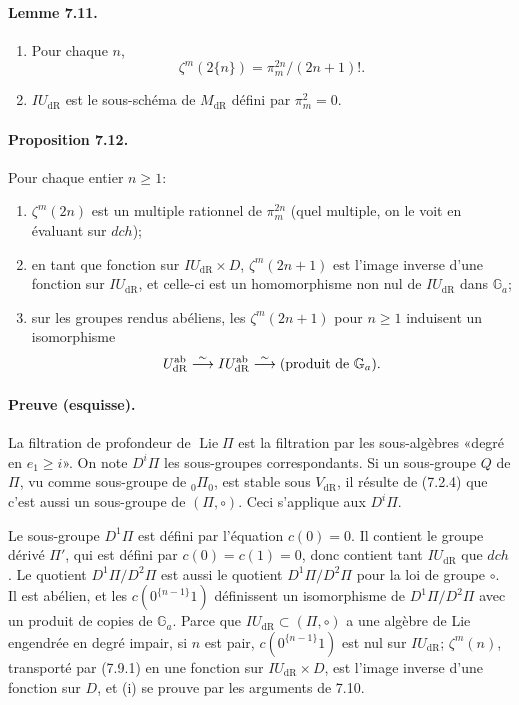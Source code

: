 \documentclass[10pt]{article}
\newcommand{\Ga}{\mathbb G_a}
\newcommand{\Lie}{\operatorname{Lie}}
\newcommand{\dR}{\mathrm{dR}}
\begin{document}
\paragraph{Lemme 7.11.}
\begin{enumerate}[label=(\roman*)]
\item Pour chaque $n$,
\[
\zeta^m(2\{n\})=\pi_m^{2n}/(2n+1)!.
\]
\item $IU_{\dR}$ est le sous-schéma de $M_{\dR}$ défini par $\pi_m^2=0$.
\end{enumerate}

\paragraph{Proposition 7.12.}
Pour chaque entier $n\geq1$:
\begin{enumerate}[label=(\roman*)]
\item $\zeta^m(2n)$ est un multiple rationnel de $\pi_m^{2n}$ (quel multiple, on le voit en évaluant sur $dch$);
\item en tant que fonction sur $IU_{\dR}\times D$, $\zeta^m(2n+1)$ est l'image inverse d'une fonction sur $IU_{\dR}$, et celle-ci est un homomorphisme non nul de $IU_{\dR}$ dans $\Ga$;
\item sur les groupes rendus abéliens, les $\zeta^m(2n+1)$ pour $n\geq1$ induisent un isomorphisme
\[
U_{\dR}^{\mathrm{ab}}\overset{\sim}{\longrightarrow}IU_{\dR}^{\mathrm{ab}}\overset{\sim}{\longrightarrow}\hbox{(produit de }\Ga\hbox{)}.
\]
\end{enumerate}

\paragraph{Preuve (esquisse).}
La filtration de profondeur de $\Lie\Pi$ est la filtration par les sous-algèbres «degré en $e_1\geq i$». On note $D^i\Pi$ les sous-groupes correspondants. Si un sous-groupe $Q$ de $\Pi$, vu comme sous-groupe de ${}_0\Pi_0$, est stable sous $V_{\dR}$, il résulte de (7.2.4) que c'est aussi un sous-groupe de $(\Pi,\circ)$. Ceci s'applique aux $D^i\Pi$.

Le sous-groupe $D^1\Pi$ est défini par l'équation $c(0)=0$. Il contient le groupe dérivé $\Pi'$, qui est défini par $c(0)=c(1)=0$, donc contient tant $IU_{\dR}$ que $dch$. Le quotient $D^1\Pi/D^2\Pi$ est aussi le quotient $D^1\Pi/D^2\Pi$ pour la loi de groupe $\circ$. Il est abélien, et les $c(0^{\{n-1\}}1)$ définissent un isomorphisme de $D^1\Pi/D^2\Pi$ avec un produit de copies de $\Ga$. Parce que $IU_{\dR}\subset(\Pi,\circ)$ a une algèbre de Lie engendrée en degré impair, si $n$ est pair, $c(0^{\{n-1\}}1)$ est nul sur $IU_{\dR}$; $\zeta^m(n)$, transporté par (7.9.1) en une fonction sur $IU_{\dR}\times D$, est l'image inverse d'une fonction sur $D$, et (i) se prouve par les arguments de 7.10.
\end{document}
